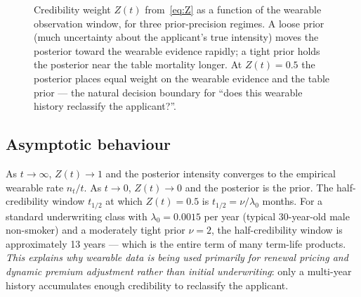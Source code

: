 \begin{figure}[ht]
\centering
{}
\caption{Credibility weight $Z(t)$ from~\eqref{eq:Z} as a function of
the wearable observation window, for three prior-precision regimes.
A loose prior (much uncertainty about the applicant's true intensity)
moves the posterior toward the wearable evidence rapidly; a tight
prior holds the posterior near the table mortality longer. At
$Z(t)=0.5$ the posterior places equal weight on the wearable
evidence and the table prior --- the natural decision boundary for
``does this wearable history reclassify the applicant?''.}
\label{fig:Z-convergence}
\end{figure}

\subsection{Asymptotic behaviour}\label{ss:asymp}

As $t\to\infty$, $Z(t)\to 1$ and the posterior intensity converges to
the empirical wearable rate $n_t/t$. As $t\to 0$, $Z(t)\to 0$ and the
posterior is the prior. The half-credibility window
$t_{1/2}$ at which $Z(t)=0.5$ is $t_{1/2} = \nu/\lambda_0$ months. For
a standard underwriting class with $\lambda_0=0.0015$ per year
(typical 30-year-old male non-smoker) and a moderately tight prior
$\nu=2$, the half-credibility window is approximately 13 years ---
which is the entire term of many term-life products. \emph{This
explains why wearable data is being used primarily for renewal
pricing and dynamic premium adjustment rather than initial
underwriting}: only a multi-year history accumulates enough
credibility to reclassify the applicant.

